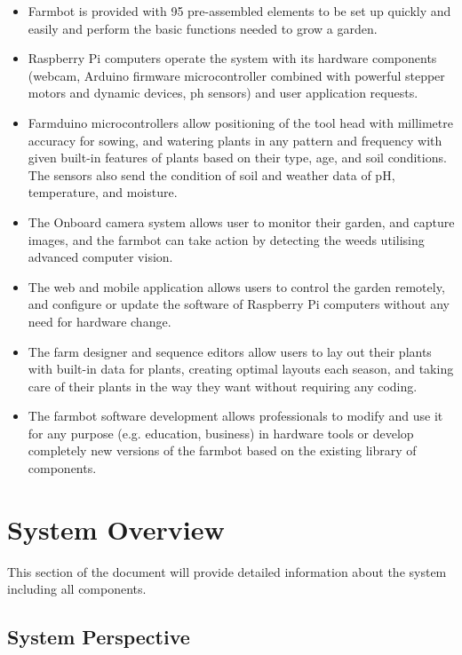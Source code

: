 \begin{itemize}
    \item Farmbot is provided with 95 pre-assembled elements to be set up quickly and easily and perform the basic functions needed to grow a garden.
    \item Raspberry Pi computers operate the system with its hardware components (webcam, Arduino firmware microcontroller combined with powerful stepper motors and dynamic devices, ph sensors) and user application requests.
    \item Farmduino microcontrollers allow positioning of the tool head with millimetre accuracy for sowing, and watering plants in any pattern and frequency with given built-in features of plants based on their type, age, and soil conditions. The sensors also send the condition of soil and weather data of pH, temperature, and moisture.
    \item The Onboard camera system allows user to monitor their garden, and capture images, and the farmbot can take action by detecting the weeds utilising advanced computer vision.
    \item The web and mobile application allows users to control the garden remotely, and configure or update the software of Raspberry Pi computers without any need for hardware change.
    \item The farm designer and sequence editors allow users to lay out their plants with built-in data for plants, creating optimal layouts each season, and taking care of their plants in the way they want without requiring any coding.
    \item The farmbot software development allows professionals to modify and use it for any purpose (e.g. education, business) in hardware tools or develop completely new versions of the farmbot based on the existing library of components.

\end{itemize}

\section{System Overview}

This section of the document will provide detailed information about the system
including all components.

\subsection{System Perspective}


